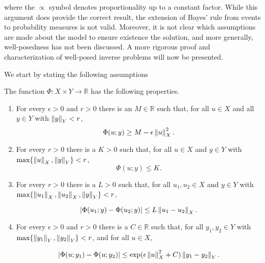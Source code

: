 where the $\propto$ symbol denotes proportionality up to a constant factor. While this argument does provide the correct result, the extension of Bayes' rule from events to probability measures is not valid. Moreover, it is not clear which assumptions are made about the model to ensure existence  the solution, and more generally, well-posedness has not been discussed. A more rigorous proof and characterization of well-posed inverse problems will now be presented.

We start by stating the following assumptions

\begin{assumption}\label{assumption-ll}
  The function $\Phi : X \times Y \rightarrow \mathbb{R}$ has the following properties.
  
  \begin{enumerate}
  \item For every $\epsilon > 0$ and $r > 0$ there is an $M \in \mathbb{R}$ such that, for all $u \in X$ and all $y \in Y$ with $\left\lVert y\right\rVert_Y < r$,
    \begin{equation*}
      \Phi(u; y) \ge M - \epsilon\left\lVert u\right\rVert_X^2.
    \end{equation*}
  \item For every $r > 0$ there is a $K > 0$ such that, for all $u \in X$ and $y \in Y$ with $\text{max}\{\left\lVert u\right\rVert_X, \left\lVert y\right\rVert_Y\} < r$,
    \begin{equation*}
      \Phi(u; y) \le K.
    \end{equation*}

  \item For every $r > 0$ there is a $L > 0$ such that, for all $u_1, u_2 \in X$ and $y \in Y$ with $\text{max}\{\left\lVert u_1\right\rVert_X, \left\lVert u_2\right\rVert_X, \left\lVert y\right\rVert_Y\} < r$,

    \begin{equation*}
      |\Phi(u_1; y) - \Phi(u_2; y)| \le L\left\lVert u_1 - u_2\right\rVert_X.
    \end{equation*}

  \item For every $\epsilon > 0$ and $r > 0$ there is a $C \in \mathbb{R}$ such that, for all $y_1, y_2 \in Y$ with $\text{max}\{\left\lVert y_1\right\rVert_Y, \left\lVert y_2\right\rVert_Y\} < r$, and for all $u \in X$,

    \begin{equation*}
      |\Phi(u; y_1) - \Phi(u; y_2)| \le \exp(\epsilon\left\lVert u\right\rVert_X^2 + C)\left\lVert y_1 - y_2\right\rVert_Y.
    \end{equation*}
  \end{enumerate}
\end{assumption}


